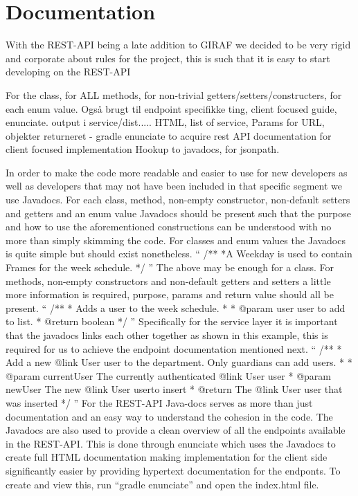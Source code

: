 \section{Documentation}
With the REST-API being a late addition to GIRAF we decided to be very rigid and corporate about rules for the project, this is such that it is easy to start developing on the REST-API

For the class, for ALL methods, for non-trivial getters/setters/constructers, for each enum value.
Også brugt til endpoint specifikke ting, client focused guide, enunciate.
output i service/dist..... HTML, list of service, Params for URL, objekter returneret -  gradle enunciate to acquire rest API documentation for client focused implementation
Hookup to javadocs, for jsonpath.

In order to make the code more readable and easier to use for new developers as well as developers that may not have been included in that specific segment we use Javadocs.
For each class, method, non-empty constructor, non-default setters and getters and an enum value Javadocs should be present such that the purpose and how to use the aforementioned constructions can be understood with no more than simply skimming the code.
For classes and enum values the Javadocs is quite simple but should exist nonetheless. 
``
/**
   *A Weekday is used to contain Frames for the week schedule.
   */
''
The above may be enough for a class.
For methods, non-empty constructors and non-default getters and setters a little more information is required, purpose, params and return value should all be present.
``
/**
   *  Adds a user to the week schedule.
   *
   * @param user user to add to list.
   * @return boolean
   */
''
Specifically for the service layer it is important that the javadocs links each other together as shown in this example, this is required for us to achieve the endpoint documentation mentioned next.
``
/**
     * Add a new {@link User user} to the department. Only guardians can add users.
     *
     * @param currentUser The currently authenticated {@link User user}
     * @param newUser     The new {@link User user}to insert
     * @return The {@link User user} that was inserted
     */
''
For the REST-API Java-docs serves as more than just documentation and an easy way to understand the cohesion in the code.
The Javadocs are also used to provide a clean overview of all the endpoints available in the REST-API.
This is done through enunciate which uses the Javadocs to create full HTML documentation making implementation for the client side significantly easier by providing hypertext documentation for the endponts.
To create and view this, run ``gradle enunciate'' and open the index.html file.

